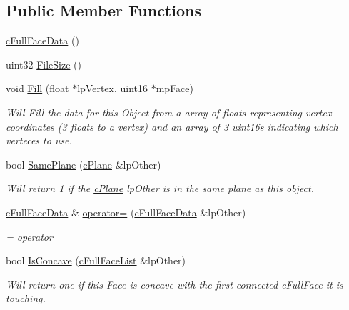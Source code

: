 \subsection*{Public Member Functions}
\begin{DoxyCompactItemize}
\item 
\hyperlink{classc_full_face_data_a63302db2911c4cace838a43347b79167}{cFullFaceData} ()
\item 
uint32 \hyperlink{classc_full_face_data_a53a99ced9de4ecdede38b2e8d63458e9}{FileSize} ()
\item 
void \hyperlink{classc_full_face_data_a8098f4af2f6d152bf27e4d8692421ce9}{Fill} (float $\ast$lpVertex, uint16 $\ast$mpFace)
\begin{DoxyCompactList}\small\item\em Will Fill the data for this Object from a array of floats representing vertex coordinates (3 floats to a vertex) and an array of 3 uint16s indicating which verteces to use. \item\end{DoxyCompactList}\item 
bool \hyperlink{classc_full_face_data_a9397eb74f9f3dd7fb82ec85c7cb291f5}{SamePlane} (\hyperlink{classc_plane}{cPlane} \&lpOther)
\begin{DoxyCompactList}\small\item\em Will return 1 if the \hyperlink{classc_plane}{cPlane} lpOther is in the same plane as this object. \item\end{DoxyCompactList}\item 
\hyperlink{classc_full_face_data}{cFullFaceData} \& \hyperlink{classc_full_face_data_a7a9bdcb3c4795ed42582aceb5624c04b}{operator=} (\hyperlink{classc_full_face_data}{cFullFaceData} \&lpOther)
\begin{DoxyCompactList}\small\item\em = operator \item\end{DoxyCompactList}\item 
bool \hyperlink{classc_full_face_data_adc17fbda36ec28287c88dccb893b23d5}{IsConcave} (\hyperlink{classc_full_face_list}{cFullFaceList} \&lpOther)
\begin{DoxyCompactList}\small\item\em Will return one if this Face is concave with the first connected cFullFace it is touching. \item\end{DoxyCompactList}\item 

\end{DoxyCompactItemize}
